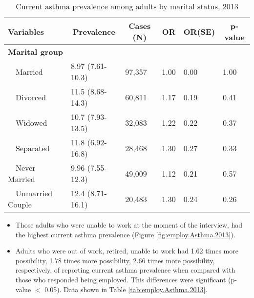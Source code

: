 \begin{table}[H]
\caption{Current asthma prevalence  among adults by marital status, 2013\label{tab:marital.Asthma.2013}} 
\begin{center}
\begin{tabular}{llllll}
\hline\hline
\multicolumn{1}{l}{Variables}&\multicolumn{1}{c}{Prevalence}&\multicolumn{1}{c}{Cases (N)}&\multicolumn{1}{c}{OR}&\multicolumn{1}{c}{OR(SE)}&\multicolumn{1}{c}{p-value}\tabularnewline
\hline
{\bfseries Marital group}&&&&&\tabularnewline
~~Married&8.97 (7.61-10.3)&97,357&1.00&0.00&1.00\tabularnewline
~~Divorced&11.5 (8.68-14.3)&60,811&1.17&0.19&0.41\tabularnewline
~~Widowed&10.7 (7.93-13.5)&32,083&1.22&0.22&0.37\tabularnewline
~~Separated&11.8 (6.92-16.8)&28,468&1.30&0.27&0.33\tabularnewline
~~Never Married&9.96 (7.55-12.3)&49,009&1.12&0.21&0.57\tabularnewline
~~Unmarried Couple&12.4 (8.71-16.1)&20,483&1.30&0.24&0.26\tabularnewline
\hline
\end{tabular}\end{center}

\end{table}

 
 \newpage
\begin{itemize}


\item Those adults who were 
unable to work at the moment of the interview, had the highest current asthma prevalence (Figure \ref{fig:employ.Asthma.2013}).

\item Adults who were out of work, retired, unable to work had 1.62 times more possibility, 1.78 times more possibility, 2.66 times more possibility, respectively, of reporting current asthma prevalence when compared with those who responded being employed. This differences were significant (p-value $<$ 0.05). 
Data shown in Table \ref{tab:employ.Asthma.2013}.


\end{itemize}


